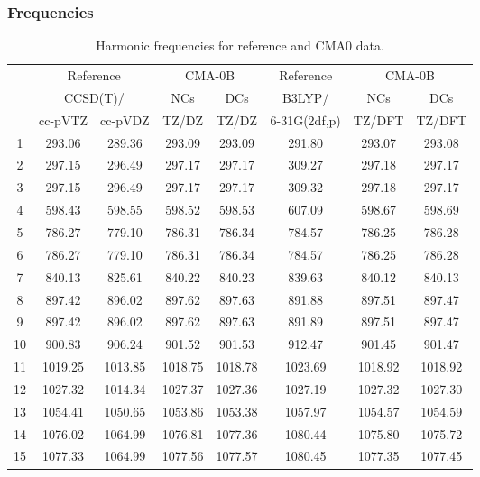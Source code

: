 \documentclass[10pt,oneside]{article}
\begin{document}
\clearpage

\subsubsection*{Frequencies}
\begin{table}[h!]
\centering
\caption{Harmonic frequencies for reference and CMA0 data.}
\begin{tabular}{cccccccc}
\toprule
{} & \multicolumn{2}{c}{Reference} & \multicolumn{2}{c}{CMA-0B} &    Reference & \multicolumn{2}{c}{CMA-0B} \\
{} & \multicolumn{2}{c}{CCSD(T)/} &     NCs &     DCs &       B3LYP/ &     NCs &     DCs \\
{} &   cc-pVTZ & cc-pVDZ &   TZ/DZ &   TZ/DZ & 6-31G(2df,p) &  TZ/DFT &  TZ/DFT \\
\midrule
1  &    293.06 &  289.36 &  293.09 &  293.09 &       291.80 &  293.07 &  293.08 \\
2  &    297.15 &  296.49 &  297.17 &  297.17 &       309.27 &  297.18 &  297.17 \\
3  &    297.15 &  296.49 &  297.17 &  297.17 &       309.32 &  297.18 &  297.17 \\
4  &    598.43 &  598.55 &  598.52 &  598.53 &       607.09 &  598.67 &  598.69 \\
5  &    786.27 &  779.10 &  786.31 &  786.34 &       784.57 &  786.25 &  786.28 \\
6  &    786.27 &  779.10 &  786.31 &  786.34 &       784.57 &  786.25 &  786.28 \\
7  &    840.13 &  825.61 &  840.22 &  840.23 &       839.63 &  840.12 &  840.13 \\
8  &    897.42 &  896.02 &  897.62 &  897.63 &       891.88 &  897.51 &  897.47 \\
9  &    897.42 &  896.02 &  897.62 &  897.63 &       891.89 &  897.51 &  897.47 \\
10 &    900.83 &  906.24 &  901.52 &  901.53 &       912.47 &  901.45 &  901.47 \\
11 &   1019.25 & 1013.85 & 1018.75 & 1018.78 &      1023.69 & 1018.92 & 1018.92 \\
12 &   1027.32 & 1014.34 & 1027.37 & 1027.36 &      1027.19 & 1027.32 & 1027.30 \\
13 &   1054.41 & 1050.65 & 1053.86 & 1053.38 &      1057.97 & 1054.57 & 1054.59 \\
14 &   1076.02 & 1064.99 & 1076.81 & 1077.36 &      1080.44 & 1075.80 & 1075.72 \\
15 &   1077.33 & 1064.99 & 1077.56 & 1077.57 &      1080.45 & 1077.35 & 1077.45 \\

\end{tabular}
\end{table}
\end{document}

